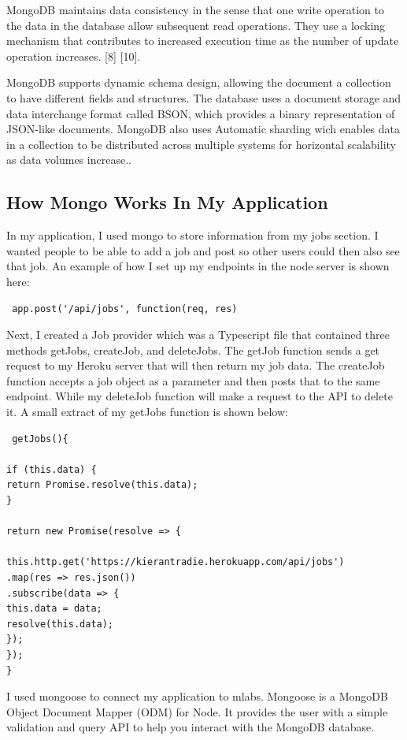 MongoDB maintains data consistency in the
sense that one write operation to the data in the database allow subsequent
read operations. They use a locking mechanism that contributes to increased
execution time as the number of update operation increases. [8] [10].

MongoDB supports dynamic schema design, allowing the document a collection to have different fields and structures. The database uses a document storage and data interchange format called BSON, which provides a binary representation of JSON-like documents. MongoDB also uses Automatic sharding wich enables data in a collection to be distributed across multiple systems for horizontal scalability as data volumes increase.\cite{MongoDB}.


\subsection{How Mongo Works In My Application}
In my application, I used mongo to store information from my jobs section. I wanted people to be able to add a job and post so other users could then also see that job. An example of how I set up my endpoints in the node server is shown here:

\begin{verbatim}
 app.post('/api/jobs', function(req, res)
\end{verbatim}

Next, I created a Job provider which was a Typescript file that contained three methods getJobs, createJob, and deleteJobs. The getJob function sends a get request to my Heroku server that will then return my job data. The createJob function accepts a job object as a parameter and then posts that to the same endpoint. While my deleteJob function will make a request to the API to delete it. A small extract of my getJobs function is shown below:

\begin{verbatim}
 getJobs(){

if (this.data) {
return Promise.resolve(this.data);
}

return new Promise(resolve => {

this.http.get('https://kierantradie.herokuapp.com/api/jobs')
.map(res => res.json())
.subscribe(data => {
this.data = data;
resolve(this.data);
});
});
}
\end{verbatim}

I used mongoose to connect my application to mlabs. Mongoose is a MongoDB Object Document Mapper (ODM) for Node. It provides the user with a simple validation and query API to help you interact with the MongoDB database.

